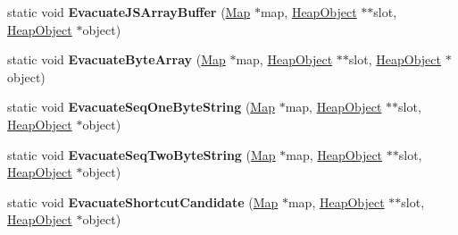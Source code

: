 \begin{DoxyCompactItemize}
\item 
static void {\bfseries Evacuate\+J\+S\+Array\+Buffer} (\hyperlink{classv8_1_1internal_1_1_map}{Map} $\ast$map, \hyperlink{classv8_1_1internal_1_1_heap_object}{Heap\+Object} $\ast$$\ast$slot, \hyperlink{classv8_1_1internal_1_1_heap_object}{Heap\+Object} $\ast$object)\hypertarget{classv8_1_1internal_1_1_scavenging_visitor_aef44c23e10fb557b5ae06b59d2ce3895}{}\label{classv8_1_1internal_1_1_scavenging_visitor_aef44c23e10fb557b5ae06b59d2ce3895}

\item 
static void {\bfseries Evacuate\+Byte\+Array} (\hyperlink{classv8_1_1internal_1_1_map}{Map} $\ast$map, \hyperlink{classv8_1_1internal_1_1_heap_object}{Heap\+Object} $\ast$$\ast$slot, \hyperlink{classv8_1_1internal_1_1_heap_object}{Heap\+Object} $\ast$object)\hypertarget{classv8_1_1internal_1_1_scavenging_visitor_a9155dea06de750e91218de4870024221}{}\label{classv8_1_1internal_1_1_scavenging_visitor_a9155dea06de750e91218de4870024221}

\item 
static void {\bfseries Evacuate\+Seq\+One\+Byte\+String} (\hyperlink{classv8_1_1internal_1_1_map}{Map} $\ast$map, \hyperlink{classv8_1_1internal_1_1_heap_object}{Heap\+Object} $\ast$$\ast$slot, \hyperlink{classv8_1_1internal_1_1_heap_object}{Heap\+Object} $\ast$object)\hypertarget{classv8_1_1internal_1_1_scavenging_visitor_a4488690eb9fae4ff167a91bd774c76ad}{}\label{classv8_1_1internal_1_1_scavenging_visitor_a4488690eb9fae4ff167a91bd774c76ad}

\item 
static void {\bfseries Evacuate\+Seq\+Two\+Byte\+String} (\hyperlink{classv8_1_1internal_1_1_map}{Map} $\ast$map, \hyperlink{classv8_1_1internal_1_1_heap_object}{Heap\+Object} $\ast$$\ast$slot, \hyperlink{classv8_1_1internal_1_1_heap_object}{Heap\+Object} $\ast$object)\hypertarget{classv8_1_1internal_1_1_scavenging_visitor_a8ec181e48e2c111eaba0e27b14670f41}{}\label{classv8_1_1internal_1_1_scavenging_visitor_a8ec181e48e2c111eaba0e27b14670f41}

\item 
static void {\bfseries Evacuate\+Shortcut\+Candidate} (\hyperlink{classv8_1_1internal_1_1_map}{Map} $\ast$map, \hyperlink{classv8_1_1internal_1_1_heap_object}{Heap\+Object} $\ast$$\ast$slot, \hyperlink{classv8_1_1internal_1_1_heap_object}{Heap\+Object} $\ast$object)\hypertarget{classv8_1_1internal_1_1_scavenging_visitor_a94de1c34c7fd7d518d8313c3c2eba131}{}\label{classv8_1_1internal_1_1_scavenging_visitor_a94de1c34c7fd7d518d8313c3c2eba131}

\end{DoxyCompactItemize}
